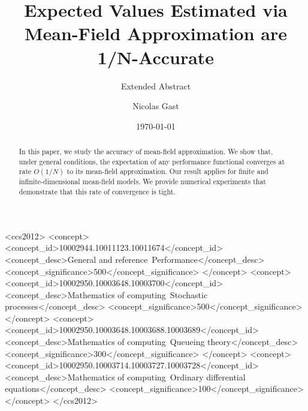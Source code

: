 \documentclass[sigconf]{acmart}
\title{Expected Values Estimated via Mean-Field Approximation are
  1/N-Accurate}%
\subtitle{Extended Abstract}%
\author{Nicolas Gast}
\affiliation{%
  \institution{Inria}%
  \streetaddress{Univ. Grenoble Alpes, CNRS, LIG}%
  \city{ Grenoble} %
  \state{France} %
  \postcode{F-38000}%
}%
\date{\today}
\begin{document}
\begin{abstract}
  In this paper, we study the accuracy of mean-field approximation.
  We show that, under general conditions, the expectation of any
  performance functional converges at rate $O(1/N)$ to its mean-field
  approximation.  Our result applies for finite and
  infinite-dimensional mean-field models.  We provide numerical
  experiments that demonstrate that this rate of convergence is tight.

\end{abstract}

\begin{CCSXML}
<ccs2012>
<concept>
<concept_id>10002944.10011123.10011674</concept_id>
<concept_desc>General and reference~Performance</concept_desc>
<concept_significance>500</concept_significance>
</concept>
<concept>
<concept_id>10002950.10003648.10003700</concept_id>
<concept_desc>Mathematics of computing~Stochastic processes</concept_desc>
<concept_significance>500</concept_significance>
</concept>
<concept>
<concept_id>10002950.10003648.10003688.10003689</concept_id>
<concept_desc>Mathematics of computing~Queueing theory</concept_desc>
<concept_significance>300</concept_significance>
</concept>
<concept>
<concept_id>10002950.10003714.10003727.10003728</concept_id>
<concept_desc>Mathematics of computing~Ordinary differential equations</concept_desc>
<concept_significance>100</concept_significance>
</concept>
</ccs2012>
\end{CCSXML}



\maketitle
\end{document}

